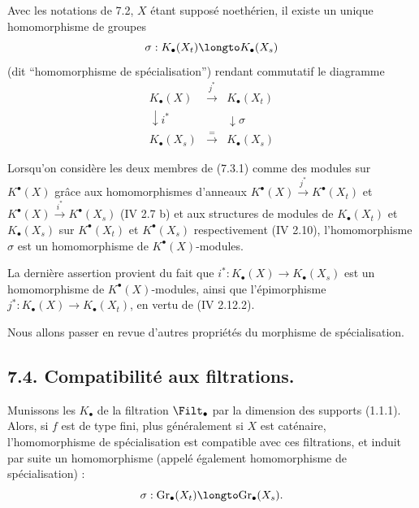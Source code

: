 \begin{proposition}[7.3]
Avec les notations de 7.2, $X$ \'etant suppos\'e noeth\'erien, il existe un unique homomorphisme de groupes
\begin{equation}\label{eq:7.3.1}
\sigma : K_{\bullet}(X_{t}) \longto K_{\bullet}(X_{s})
\end{equation}
(dit ``homomorphisme de sp\'ecialisation'') rendant commutatif le diagramme
\begin{equation}\label{eq:7.3.2}
\begin{array}{ccc}
K_{\bullet}(X) & \xrightarrow{\,j^{*}\,} & K_{\bullet}(X_{t}) \\
\downarrow{\scriptstyle i^{*}} & & \downarrow{\scriptstyle \sigma} \\
K_{\bullet}(X_{s}) & \xrightarrow{\,\text{=}\,} & K_{\bullet}(X_{s})
\end{array}
\end{equation}
\end{proposition}

Lorsqu'on consid\`ere les deux membres de (7.3.1) comme des modules sur $K^{\bullet}(X)$ gr\^ace aux homomorphismes d'anneaux $K^{\bullet}(X) \xrightarrow{j^{*}} K^{\bullet}(X_{t})$ et $K^{\bullet}(X) \xrightarrow{i^{*}} K^{\bullet}(X_{s})$ (IV 2.7 b) et aux structures de modules de $K_{\bullet}(X_{t})$ et $K_{\bullet}(X_{s})$ sur $K^{\bullet}(X_{t})$ et $K^{\bullet}(X_{s})$ respectivement (IV 2.10), l'homomorphisme $\sigma$ est un homomorphisme de $K^{\bullet}(X)$-modules.

La derni\`ere assertion provient du fait que $i^{*} : K_{\bullet}(X) \to K_{\bullet}(X_{s})$ est un homomorphisme de $K^{\bullet}(X)$-modules, ainsi que l'\'epimorphisme $j^{*} : K_{\bullet}(X) \to K_{\bullet}(X_{t})$, en vertu de (IV 2.12.2).

Nous allons passer en revue d'autres propri\'et\'es du morphisme de sp\'ecialisation.

\subsection*{7.4. Compatibilit\'e aux filtrations.}

Munissons les $K_{\bullet}$ de la filtration $\Filt_{\bullet}$ par la dimension des supports (1.1.1). Alors, si $f$ est de type fini, plus g\'en\'eralement si $X$ est cat\'enaire, l'homomorphisme de sp\'ecialisation est compatible avec ces filtrations, et induit par suite un homomorphisme (appel\'e \'egalement homomorphisme de sp\'ecialisation) :
\begin{equation}\label{eq:7.4.1}
\sigma : \mathrm{Gr}_{\bullet}(X_{t}) \longto \mathrm{Gr}_{\bullet}(X_{s}).
\end{equation}

